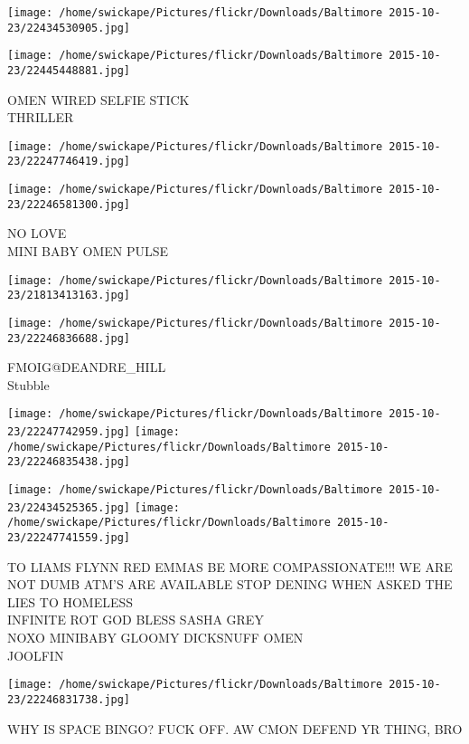 \documentclass[10pt,letterpaper]{article}
\begin{document}
\texttt{[image: /home/swickape/Pictures/flickr/Downloads/Baltimore 2015-10-23/22434530905.jpg]}

\vspace{0.25in}
\texttt{[image: /home/swickape/Pictures/flickr/Downloads/Baltimore 2015-10-23/22445448881.jpg]}

OMEN WIRED SELFIE STICK\\
THRILLER\\
\pagebreak

\texttt{[image: /home/swickape/Pictures/flickr/Downloads/Baltimore 2015-10-23/22247746419.jpg]}

\vspace{0.25in}
\texttt{[image: /home/swickape/Pictures/flickr/Downloads/Baltimore 2015-10-23/22246581300.jpg]}

NO LOVE\\
MINI BABY OMEN PULSE\\
\pagebreak

\texttt{[image: /home/swickape/Pictures/flickr/Downloads/Baltimore 2015-10-23/21813413163.jpg]}

\vspace{0.25in}
\texttt{[image: /home/swickape/Pictures/flickr/Downloads/Baltimore 2015-10-23/22246836688.jpg]}

FMOIG@DEANDRE\_HILL\\
Stubble\\
\pagebreak

\texttt{[image: /home/swickape/Pictures/flickr/Downloads/Baltimore 2015-10-23/22247742959.jpg]}
\texttt{[image: /home/swickape/Pictures/flickr/Downloads/Baltimore 2015-10-23/22246835438.jpg]}

\texttt{[image: /home/swickape/Pictures/flickr/Downloads/Baltimore 2015-10-23/22434525365.jpg]}
\texttt{[image: /home/swickape/Pictures/flickr/Downloads/Baltimore 2015-10-23/22247741559.jpg]}

TO LIAMS FLYNN RED EMMAS BE MORE COMPASSIONATE!!! WE ARE NOT DUMB ATM'S ARE AVAILABLE STOP DENING WHEN ASKED THE LIES TO HOMELESS\\
INFINITE ROT GOD BLESS SASHA GREY\\
NOXO MINIBABY GLOOMY DICKSNUFF OMEN\\
JOOLFIN\\
\pagebreak

\texttt{[image: /home/swickape/Pictures/flickr/Downloads/Baltimore 2015-10-23/22246831738.jpg]}

WHY IS SPACE BINGO?  FUCK OFF.  AW CMON DEFEND YR THING, BRO\\
\pagebreak
\end{document}
